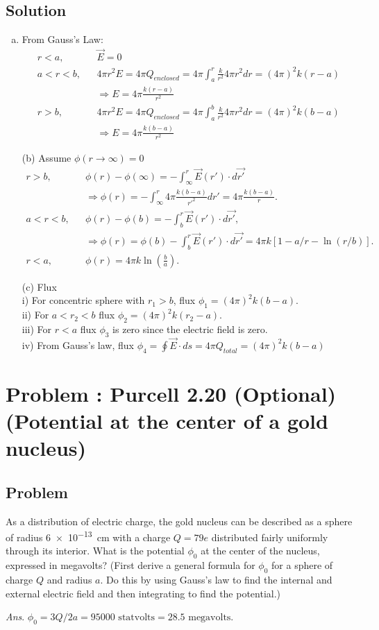 \documentclass[solutions]{esg8022pset}
\begin{document}
\subsection{Solution}
  \begin{enumerate}[(a)]
    \item From Gauss's Law:
\begin{eqnarray}
r<a,   && \vec{E}=0\\
a<r<b, && 4\pi r^2 E = 4\pi Q_{enclosed} = 4\pi\int_a^r \frac{k}{r^2}4\pi r^2dr=(4\pi)^2k(r-a)\\
       && \Rightarrow E = 4\pi \frac{k(r-a)}{r^2}\\
r>b,   && 4\pi r^2 E = 4\pi Q_{enclosed} = 4\pi\int_a^b \frac{k}{r^2}4\pi r^2dr=(4\pi)^2k(b-a)\\
       && \Rightarrow E= 4\pi \frac{k(b-a)}{r^2}
\end{eqnarray}

(b) Assume $\phi(r\rightarrow\infty)=0$\\
\begin{eqnarray}
r>b,  & &  \phi(r)-\phi(\infty)=-\int_\infty^r \vec{E}(r') \cdot d\vec{r'} \\
      & &\Rightarrow \phi(r)=-\int_\infty^r 4\pi \frac{k(b-a)}{r'^2}dr'=4\pi \frac{k(b-a)}{r}.\\
a<r<b,& &\phi(r)-\phi(b)=-\int_b^r\vec{E}(r') \cdot d\vec{r'},\\
      & &\Rightarrow \phi(r)= \phi(b)-\int_b^r\vec{E}(r') \cdot d\vec{r'}=4\pi k [1-a/r-\ln (r/b)].\\
r<a, & & \phi(r)= 4\pi k\ln (\frac{b}{a}).
\end{eqnarray}

(c) Flux \\
i) For concentric sphere with $r_1>b$, flux $\phi_1=(4\pi)^2k(b-a)$.\\
ii) For $a<r_2<b$ flux $\phi_2=(4\pi)^2k(r_2-a)$.\\
iii) For $r<a$ flux $\phi_3$ is zero since the electric field is zero.\\
iv) From Gauss's law, flux $\phi_4=\oint\vec{E} \cdot ds = 4\pi
Q_{total} = (4\pi)^2 k(b-a)$
  \end{enumerate}
\section{Problem \thesection: Purcell 2.20 (Optional) (Potential at the center of a gold nucleus)}
\subsection{Problem}
  As a distribution of electric charge, the gold nucleus can be
  described as a sphere of radius \SI{6e-13}{\centi\meter} with a charge $Q = 79e$
  distributed fairly uniformly through its interior. What is the potential
  $\phi_0$ at the center of the nucleus, expressed in megavolts? (First derive
  a general formula for $\phi_0$ for a sphere of charge $Q$ and radius $a$. Do
  this by using Gauss's law to find the internal and external electric field
  and then integrating to find the potential.)
  \begin{flushright} \emph{Ans}. $\phi_0 = 3Q/2a = \num{95000}\text{ statvolts} = 28.5\text{ megavolts}$. \end{flushright}
\end{document}
